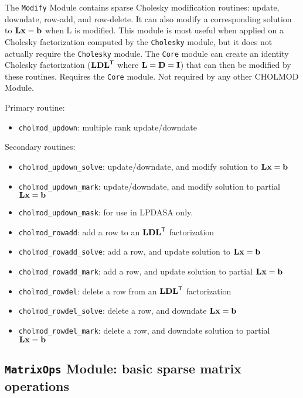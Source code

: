 \documentclass[11pt]{article}
\newcommand{\m}[1]{{\bf{#1}}}       %
\newcommand{\tr}{^{\sf T}}          %
\begin{document}
The {\tt Modify} Module contains sparse Cholesky modification routines:
update, downdate, row-add, and row-delete.
It can also modify a corresponding solution to $\m{Lx}=\m{b}$ when L is modified.
This module is most useful when applied on a Cholesky factorization computed by
the {\tt Cholesky} module, but it does not actually require the {\tt Cholesky} module.
The {\tt Core} module can create an identity Cholesky factorization ($\m{LDL}\tr$ where
$\m{L}=\m{D}=\m{I}$) that can then be modified by these routines.
Requires the {\tt Core} module.  Not required by any other CHOLMOD Module.

\vspace{0.1in}
\noindent Primary routine:
    \begin{itemize}
    \item {\tt cholmod\_updown}: multiple rank update/downdate
    \end{itemize}

\noindent Secondary routines:
    \begin{itemize}
    \item {\tt cholmod\_updown\_solve}: update/downdate, and modify solution to $\m{Lx=b}$
    \item {\tt cholmod\_updown\_mark}: update/downdate, and modify solution to partial $\m{Lx=b}$
    \item {\tt cholmod\_updown\_mask}: for use in LPDASA only.
    \item {\tt cholmod\_rowadd}: add a row to an $\m{LDL}\tr$ factorization
    \item {\tt cholmod\_rowadd\_solve}: add a row, and update solution to $\m{Lx=b}$
    \item {\tt cholmod\_rowadd\_mark}: add a row, and update solution to partial $\m{Lx=b}$
    \item {\tt cholmod\_rowdel}: delete a row from an $\m{LDL}\tr$ factorization
    \item {\tt cholmod\_rowdel\_solve}: delete a row, and downdate $\m{Lx=b}$
    \item {\tt cholmod\_rowdel\_mark}: delete a row, and downdate solution to partial $\m{Lx=b}$
    \end{itemize}

\subsection{{\tt MatrixOps} Module: basic sparse matrix operations}
\end{document}
